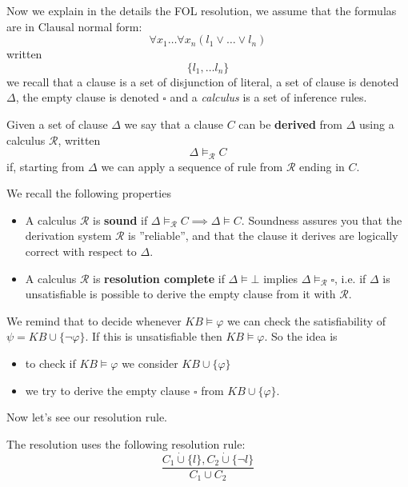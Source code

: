 \documentclass[10pt, letterpaper]{report}
\begin{document}
Now we explain in the details the FOL resolution, we assume that the formulas are in Clausal normal form:\begin{equation}
    \forall x_1\dots \forall x_n(l_1\lor \dots \lor l_n)
\end{equation}
written\begin{equation}
    \{l_1,\dots l_n\}
\end{equation}
we recall that a clause is a set of disjunction of literal, a set of clause is denoted $\Delta$, the empty clause is denoted $\square$ and a \textit{calculus} is a set of inference rules.
\begin{definition}[Derivation]
    Given a set of clause $\Delta$ we say that a clause $C$ can be \textbf{derived} from $\Delta$ using a calculus $\mathcal R$, written \[\Delta\models_{\mathcal R}C\]
    if, starting from $\Delta$ we can apply a sequence of rule from $\mathcal R$ ending in $C$.
\end{definition}
We recall the following properties\begin{itemize}
    \item A calculus $\mathcal R$ is \textbf{sound} if $\Delta\models_{\mathcal R}C\implies \Delta\models C$. Soundness assures you that the derivation system $\mathcal R$  is ''reliable'', and that the clause it derives are logically correct with respect to $\Delta$.
    \item A calculus $\mathcal R$ is \textbf{resolution complete} if $\Delta\models \bot$ implies $\Delta\models_{\mathcal R}\square$, i.e. if $\Delta$ is unsatisfiable is possible to derive the empty clause from it with $\mathcal R$.
\end{itemize}
We remind that to decide whenever $KB\models \varphi$ we can check the satisfiability of $\psi = KB\cup\{\lnot\varphi\}$. If this is unsatisfiable then $KB\models \varphi$. So the idea is\begin{itemize}
    \item to check if $KB\models \varphi$ we consider $KB\cup\{\varphi\}$
    \item we try to derive the empty clause $\square$ from $KB\cup\{\varphi\}$.
\end{itemize}
Now let's see our resolution rule.
\begin{definition}
    The resolution uses the following resolution rule:\begin{equation}
        \frac{C_1\dot\cup\{l\},C_2\dot\cup\{\lnot l\}}{C_1\cup C_2}
    \end{equation}
\end{definition}
\end{document}
